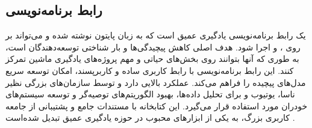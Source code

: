 \subsection{رابط برنامه‌نویسی }
 یک رابط برنامه‌نویسی یادگیری عمیق است که به زبان پایتون نوشته شده و می‌تواند بر روی ،  و  اجرا شود. هدف اصلی  کاهش پیچیدگی‌ها و بار شناختی توسعه‌دهندگان است، 
به طوری که آنها بتوانند روی بخش‌های حیاتی و مهم پروژه‌های یادگیری ماشین تمرکز کنند. این رابط برنامه‌نویسی با رابط کاربری ساده و کاربرپسند، امکان توسعه سریع مدل‌های پیچیده را فراهم
می‌کند.  عملکرد بالایی دارد و توسط سازمان‌های بزرگی نظیر ناسا، یوتیوب و  برای تحلیل داده‌ها، بهبود الگوریتم‌های توصیه‌گر و توسعه سیستم‌های خودران مورد استفاده قرار 
می‌گیرد. این کتابخانه با مستندات جامع و پشتیبانی از جامعه کاربری بزرگ، به یکی از ابزارهای محبوب در حوزه یادگیری عمیق تبدیل شده‌است \cite{AboutKer57:online}.



